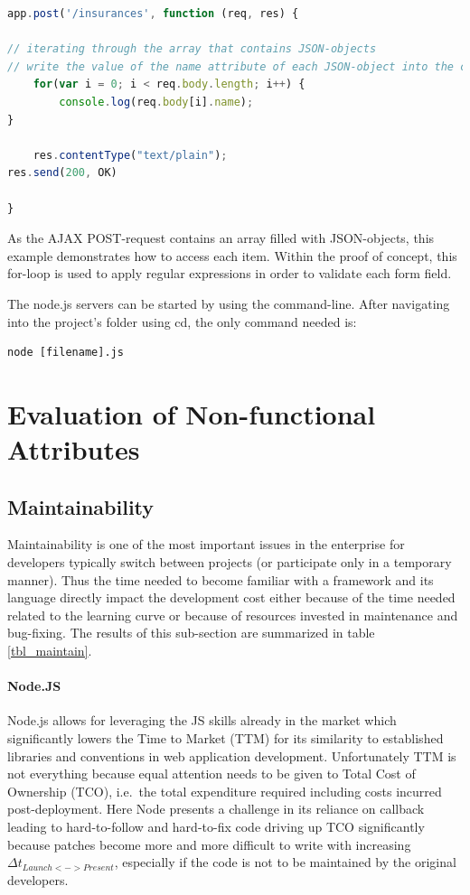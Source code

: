 \begin{lstlisting}[language=javascript,caption={Iteration through an array consisting of JSON data}]
app.post('/insurances', function (req, res) {

// iterating through the array that contains JSON-objects
// write the value of the name attribute of each JSON-object into the console
    for(var i = 0; i < req.body.length; i++) {
        console.log(req.body[i].name);
}

    res.contentType("text/plain");
res.send(200, OK)

}
\end{lstlisting}

As the AJAX POST-request contains an array filled with JSON-objects, this example demonstrates how to access each item. Within the proof of concept, this for-loop is used to apply regular expressions in order to validate each form field.

The node.js servers can be started by using the command-line. After navigating into the project’s folder using cd, the only command needed is:
\begin{lstlisting}[caption={Executing Node.js code}]
node [filename].js
\end{lstlisting}

\newpage
\section{Evaluation of Non-functional Attributes}
\label{evaluation_nonfunctional}

\subsection{Maintainability}
\label{maintainability}
Maintainability is one of the most important issues in the enterprise for developers typically switch between projects (or participate only in a temporary manner). Thus the time needed to become familiar with a framework and its language directly impact the development cost either because of the time needed related to the learning curve or because of resources invested in maintenance and bug-fixing.
The results of this sub-section are summarized in table \ref{tbl_maintain}.\\

\paragraph{Node.JS}
Node.js allows for leveraging the JS skills already in the market which significantly lowers the Time to Market (TTM) for its similarity to established libraries and conventions in web application development. Unfortunately TTM is not everything because equal attention needs to be given to Total Cost of Ownership (TCO), i.e.\ the total expenditure required including costs incurred post-deployment. Here Node presents a challenge in its reliance on callback leading to hard-to-follow and hard-to-fix code driving up TCO significantly because patches become more and more difficult to write with increasing $\Delta t_{Launch<->Present}$, especially if the code is not to be maintained by the original developers.

